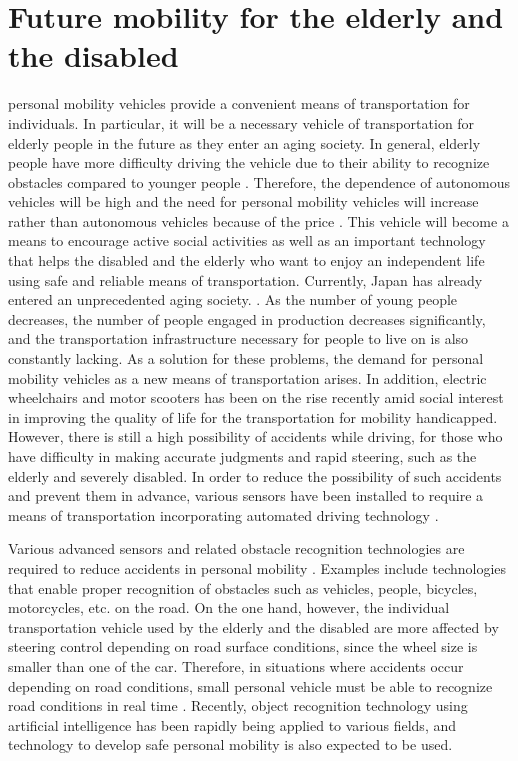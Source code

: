 \documentclass{ieeeaccess}
\begin{document}
\section{Future mobility for the elderly and the disabled}
\label{sec:introduction}
 personal mobility vehicles provide a convenient means of transportation for individuals. In particular, it will be a necessary vehicle of transportation for elderly people in the future as they enter an aging society. In general, elderly people have more difficulty driving the vehicle due to their ability to recognize obstacles compared to younger people \cite{b01}. Therefore, the dependence of autonomous vehicles will be high and the need for personal mobility vehicles will increase rather than autonomous vehicles because of the price \cite{b02}. This vehicle will become a means to encourage active social activities as well as an important technology that helps the disabled and the elderly who want to enjoy an independent life using safe and reliable means of transportation. Currently, Japan has already entered an unprecedented aging society. \cite{b03, b04}. As the number of young people decreases, the number of people engaged in production decreases significantly, and the transportation infrastructure necessary for people to live on is also constantly lacking. As a solution for these problems, the demand for personal mobility vehicles as a new means of transportation arises. In addition, electric wheelchairs and motor scooters has been on the rise recently amid social interest in improving the quality of life for the transportation for mobility handicapped. However, there is still a high possibility of accidents while driving, for those who have difficulty in making accurate judgments and rapid steering, such as the elderly and severely disabled. In order to reduce the possibility of such accidents and prevent them in advance, various sensors have been installed to require a means of transportation incorporating automated driving technology \cite{b05, b06}.

Various advanced sensors and related obstacle recognition technologies are required to reduce accidents in personal mobility \cite{b07}. Examples include technologies that enable proper recognition of obstacles such as vehicles, people, bicycles, motorcycles, etc. on the road. On the one hand, however, the individual transportation vehicle used by the elderly and the disabled are more affected by steering control depending on road surface conditions, since the wheel size is smaller than one of the car. Therefore, in situations where accidents occur depending on road conditions, small personal vehicle must be able to recognize road conditions in real time \cite{b08}. Recently, object recognition technology using artificial intelligence has been rapidly being applied to various fields, and technology to develop safe personal mobility is also expected to be used.
\end{document}
